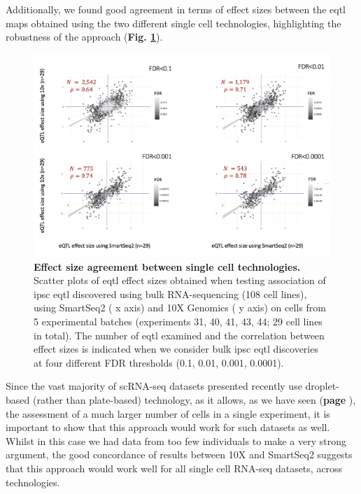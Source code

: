 \newpage

Additionally, we found good agreement in terms of effect sizes between the \gls{eqtl} maps obtained using the two different single cell technologies, highlighting the robustness of the approach (\textbf{Fig. \ref{fig:sc_eqtl_technologies}}). \\

\begin{figure}[h]
\centering
\includegraphics[width=15cm]{Chapter3/Fig/beta_comparison_ss2_vs_10x.png}
\caption[iPSC sc-eQTL replication across technologies]{\textbf{Effect size agreement between single cell technologies.}\\
Scatter plots of \gls{eqtl} effect sizes obtained when testing association of \gls{ipsc} \gls{eqtl} discovered using bulk RNA-sequencing (108 cell lines), using SmartSeq2 (\cite{picelli2013smart} x axis) and 10X Genomics (\cite{zheng2017massively} y axis) on cells from 5 experimental batches (experiments 31, 40, 41, 43, 44; 29 cell lines in total). 
The number of \gls{eqtl} examined and the correlation between effect sizes is indicated when we consider bulk \gls{ipsc} \gls{eqtl} discoveries at four different FDR thresholds (0.1, 0.01, 0.001, 0.0001).}
\label{fig:sc_eqtl_technologies}
\end{figure}

Since the vast majority of scRNA-seq datasets presented recently use droplet-based (rather than plate-based) technology, as it allows, as we have seen (\textbf{page \pageref{fig:scrnaseq_plate_vs_droplet}}), the assessment of a much larger number of cells in a single experiment, it is important to show that this approach would work for such datasets as well. 
Whilst in this case we had data from too few individuals to make a very strong argument, the good concordance of results between 10X and SmartSeq2 suggests that this approach would work well for all single cell RNA-seq datasets, across technologies.

